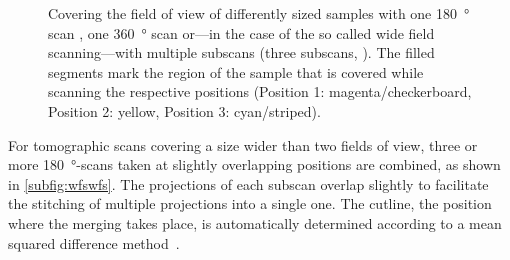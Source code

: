 \begin{figure}[htb]
{
		\label{subfig:wfswfs}		
	}%
	\caption[Covering the field of view of different samples]{Covering the field of view of differently sized samples with one \SI{180}{\degree} scan , one \SI{360}{\degree} scan  or---in the case of the so called wide field scanning---with multiple subscans (three subscans, ). The filled segments mark the region of the sample that is covered while scanning the respective positions (Position 1: magenta/checkerboard, Position 2: yellow, Position 3: cyan/striped).}
	\label{fig:scanning-possibilities}
\end{figure}%

For tomographic scans covering a size wider than two fields of view, three or more \SI{180}{\degree}-scans taken at slightly overlapping positions are combined, as shown in \autoref{subfig:wfswfs}. The projections of each subscan overlap slightly to facilitate the stitching of multiple projections into a single one. The cutline, \ie the position where the merging takes place, is automatically determined according to a mean squared difference method~\cite{Hintermueller2010}.

